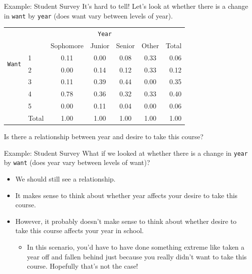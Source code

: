 \begin{frame}{Example: Student Survey}
    It's hard to tell! Let's look at whether there is a change in \texttt{want} by \texttt{year} (does want vary between levels of year).
    
    \begin{center}
        \begin{tabular}{r l cccc r}
		& & \multicolumn{4}{c}{{\texttt{Year}}} & \\
        \cline{3-6}
		& & Sophomore & Junior & Senior & Other & Total  \\ 
        \cline{2-7}
        \multirow{2}{*}{{\texttt{Want}}} 
        & 1 & 0.11 & 0.00 & 0.08 & 0.33 & 0.06 \\ 
  		& 2 & 0.00 & 0.14 & 0.12 & 0.33 & 0.12 \\ 
  		& 3 & 0.11 & 0.39 & 0.44 & 0.00 & 0.35 \\ 
  		& 4 & 0.78 & 0.36 & 0.32 & 0.33 & 0.40 \\ 
  		& 5 & 0.00 & 0.11 & 0.04 & 0.00 & 0.06 \\ 
        \cline{2-7}
  		& Total	& 1.00 & 1.00 & 1.00 & 1.00 & 1.00 \\
        \cline{2-7}
    \end{tabular}
    \end{center}
    
    Is there a relationship between year and desire to take this course?
\end{frame}

\begin{frame}{Example: Student Survey}
    What if we looked at whether there is a change in \texttt{year} by \texttt{want} (does year vary between levels of want)?
    \begin{itemize}
        \item We should still see a relationship.
        \item It makes sense to think about whether year affects your desire to take this course.
        \item However, it probably doesn't make sense to think about whether desire to take this course affects your year in school.
        \begin{itemize}
            \item In this scenario, you'd have to have done something extreme like taken a year off and fallen behind just because you really didn't want to take this course. Hopefully that's not the case!
        \end{itemize}
    \end{itemize}
\end{frame}

